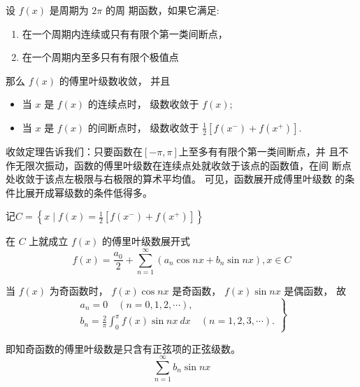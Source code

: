 \begin{theorem}
    设 $ f(x) $ 是周期为 $ 2 \pi $ 的周 期函数，如果它满足:

    \begin{enumerate}
        \item 在一个周期内连续或只有有限个第一类间断点，
        \item 在一个周期内至多只有有限个极值点
    \end{enumerate}

    那么 $ f(x) $ 的傅里叶级数收敛， 并且

    \begin{itemize}
    \item 当 $ x $ 是 $ f(x) $ 的连续点时， 级数收敛于 $ f(x) $;
    \item 当 $ x $ 是 $ f(x) $ 的间断点时， 级数收敛于 $ \frac{1}{2}\left[f\left(x^{-}\right)+f\left(x^{+}\right)\right] $.
    \end{itemize}
\end{theorem}

收敛定理告诉我们：只要函数在$[-\pi,\pi]$上至多有有限个第一类间断点，并
且不作无限次振动，函数的傅里叶级数在连续点处就收敛于该点的函数值，在间
断点处收敛于该点左极限与右极限的算术平均值。 可见，函数展开成傅里叶级数
的条件比展开成幂级数的条件低得多。 

\begin{corollary}
    记$
C=\left\{x \mid f(x)=\frac{1}{2}\left[f\left(x^{-}\right)+f\left(x^{+}\right)\right]\right\}
$

在 $ C $ 上就成立 $ f(x) $ 的傅里叶级数展开式
\begin{equation}
f(x)=\frac{a_{0}}{2}+\sum_{n=1}^{\infty}\left(a_{n} \cos n x+b_{n} \sin n x\right), x \in C
\end{equation}
\end{corollary}

\begin{definition}[正弦级数]
    当 $ f(x) $ 为奇函数时， $ f(x) \cos n x $ 是奇函数， $ f(x) \sin n x $ 是偶函数， 故
\begin{equation}
\left.\begin{array}{l}
a_{n}=0 \quad(n=0,1,2, \cdots), \\
b_{n}=\frac{2}{\pi} \int_{0}^{\pi} f(x) \sin n x {~d} x \quad(n=1,2,3, \cdots) .
\end{array}\right\}
\end{equation}

即知奇函数的傅里叶级数是只含有正弦项的正弦级数。
\begin{equation} \sum_{n=1}^{\infty} b_{n} \sin n x \end{equation}
\end{definition}

